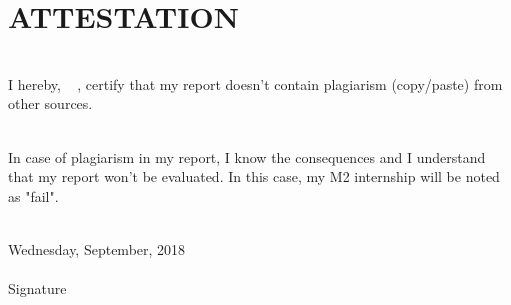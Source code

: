 \chapter*{ATTESTATION}



\vfill


\noindent\hrulefill

~\\


I hereby,  \FirstName~  \LastName, certify that my report doesn't contain plagiarism (copy/paste) from other sources.

~\\

In case of plagiarism in my report, I know the consequences and I understand that my report won't be evaluated. In this case, my M2 internship will be noted as "fail".


~\\

 Wednesday,  September, 2018 \\

~\\
 
 Signature

 ~\\
 ~\\
 ~\\
 ~\\
 ~\\
 ~\\
 
 \FirstName~  \LastName
 

~\\
~\\
~\\
~\\
~\\

\noindent\hrulefill


\vfill


\vfill


